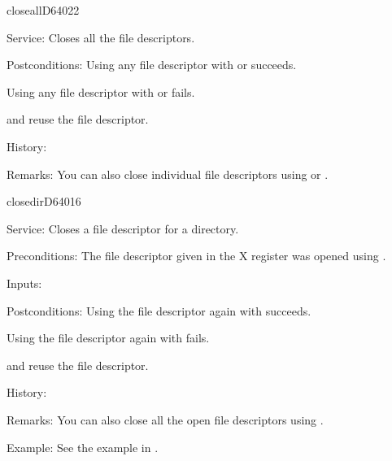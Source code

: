 \newpage
\begin{hyppotrap}{closeall}{D640}{22}
\item [Service:]
  Closes all the file descriptors.
\item [Postconditions:]
  Using any file descriptor with  or 
  succeeds.

  Using any file descriptor with  or 
  fails.

   and  reuse the file descriptor.
\item [History:]
\item [Remarks:]
  You can also close individual file descriptors using  or
  .
\end{hyppotrap}


\newpage
\begin{hyppotrap}{closedir}{D640}{16}
\item [Service:]
  Closes a file descriptor for a directory.
\item [Preconditions:]
  The file descriptor given in the X register was opened using
  .
\item [Inputs:]
\item [Postconditions:]
  Using the file descriptor again with  succeeds.

  Using the file descriptor again with  fails.

   and  reuse the file descriptor.
\item [History:]
\item [Remarks:]
  You can also close all the open file descriptors using .
\item [Example:]
  See the example in .
\end{hyppotrap}


